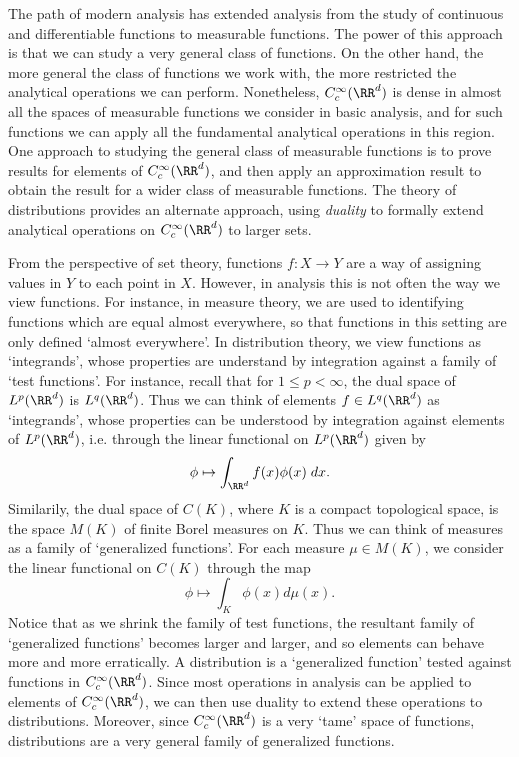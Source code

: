 The path of modern analysis has extended analysis from the study of continuous and differentiable functions to measurable functions. The power of this approach is that we can study a very general class of functions. On the other hand, the more general the class of functions we work with, the more restricted the analytical operations we can perform. Nonetheless, $C^\infty_c(\RR^d)$ is dense in almost all the spaces of measurable functions we consider in basic analysis, and for such functions we can apply all the fundamental analytical operations in this region. One approach to studying the general class of measurable functions is to prove results for elements of $C_c^\infty(\RR^d)$, and then apply an approximation result to obtain the result for a wider class of measurable functions. The theory of distributions provides an alternate approach, using \emph{duality} to formally extend analytical operations on $C^\infty_c(\RR^d)$ to larger sets.

From the perspective of set theory, functions $f: X \to Y$ are a way of assigning values in $Y$ to each point in $X$. However, in analysis this is not often the way we view functions. For instance, in measure theory, we are used to identifying functions which are equal almost everywhere, so that functions in this setting are only defined `almost everywhere'. In distribution theory, we view functions as `integrands', whose properties are understand by integration against a family of `test functions'. For instance, recall that for $1 \leq p < \infty$, the dual space of $L^p(\RR^d)$ is $L^q(\RR^d)$. Thus we can think of elements $f \in L^q(\RR^d)$ as `integrands', whose properties can be understood by integration against elements of $L^p(\RR^d)$, i.e. through the linear functional on $L^p(\RR^d)$ given by
%
\[ \phi \mapsto \int_{\RR^d} f(x) \phi(x)\; dx. \]
%
Similarily, the dual space of $C(K)$, where $K$ is a compact topological space, is the space $M(K)$ of finite Borel measures on $K$. Thus we can think of measures as a family of `generalized functions'. For each measure $\mu \in M(K)$, we consider the linear functional on $C(K)$ through the map
%
\[ \phi \mapsto \int_K \phi(x) d\mu(x). \]
%
Notice that as we shrink the family of test functions, the resultant family of `generalized functions' becomes larger and larger, and so elements can behave more and more erratically. A distribution is a `generalized function' tested against functions in $C_c^\infty(\RR^d)$. Since most operations in analysis can be applied to elements of $C_c^\infty(\RR^d)$, we can then use duality to extend these operations to distributions. Moreover, since $C_c^\infty(\RR^d)$ is a very `tame' space of functions, distributions are a very general family of generalized functions.

